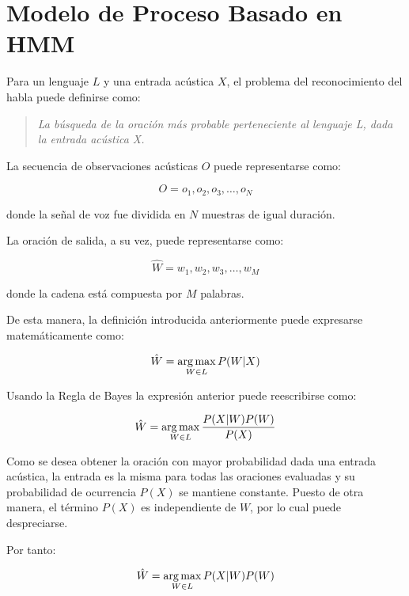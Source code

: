 \section{Modelo de Proceso Basado en HMM}
\label{sec:ModeloHMM}

Para un lenguaje $L$ y una entrada ac\'ustica $X$, el problema del reconocimiento del habla puede definirse como:

\begin{quote}
\emph{La b\'usqueda de la oraci\'on m\'as probable perteneciente al lenguaje L, dada la entrada ac\'ustica X.}
\end{quote}

La secuencia de observaciones ac\'usticas $O$ puede representarse como:

\begin{equation*}
O = o_1,o_2,o_3,\ldots,o_N
\end{equation*}

donde la se\~nal de voz fue dividida en $N$ muestras de igual duraci\'on.

La oraci\'on de salida, a su vez, puede representarse como:

\begin{equation*}
\hat{W}  = w_1,w_2,w_3,\ldots,w_M
\end{equation*}

donde la cadena est\'a compuesta por $M$ palabras.

De esta manera, la definici\'on introducida anteriormente puede expresarse matem\'aticamente como:

\begin{equation*}
\hat{W} = \operatorname*{arg\,max}_{W \in L} P(W|X)
\end{equation*}

Usando la Regla de Bayes la expresi\'on anterior puede reescribirse como:

\begin{equation*}
\hat{W} = \operatorname*{arg\,max}_{W \in L} \frac{P(X|W)P(W)}{P(X)}
\end{equation*}

Como se desea obtener la oraci\'on con mayor probabilidad dada una entrada ac\'ustica, la entrada es
la misma para todas las oraciones evaluadas y su probabilidad de ocurrencia $P(X)$ se mantiene constante.
Puesto de otra manera, el t\'ermino $P(X)$ es independiente de $W$, por lo cual puede despreciarse. 

Por tanto:

\begin{equation*}
\hat{W} = \operatorname*{arg\,max}_{W \in L} P(X|W)P(W)
\end{equation*}

